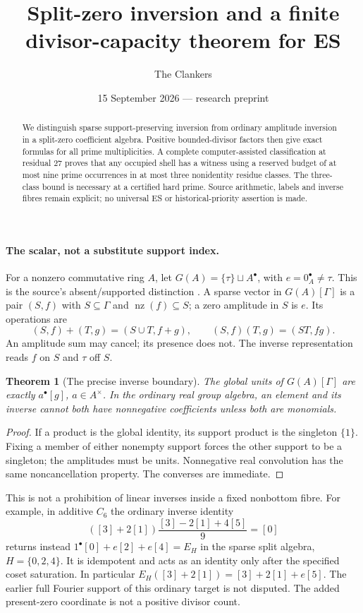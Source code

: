 \documentclass[10pt,a4paper]{article}
\title{Split-zero inversion and a finite divisor-capacity theorem for ES}
\author{The Clankers}
\date{15 September 2026 --- research preprint}
\newtheorem{theorem}{Theorem}
\begin{document}
\maketitle
\begin{abstract}
We distinguish sparse support-preserving inversion from ordinary amplitude
inversion in a split-zero coefficient algebra. Positive bounded-divisor factors
then give exact formulas for all prime multiplicities. A complete computer-assisted
classification at residual 27 proves that any occupied shell has a witness
using a reserved budget of at most nine prime occurrences in at most three
nonidentity residue classes. The three-class bound is necessary at a certified
hard prime. Source arithmetic, labels and inverse fibres remain explicit;
no universal ES or historical-priority assertion is made.
\end{abstract}

\paragraph{The scalar, not a substitute support index.}
For a nonzero commutative ring $A$, let
$G(A)=\{\tau\}\sqcup A^\bullet$, with $e=0_A^\bullet\ne\tau$.
This is the source's absent/supported distinction \cite{SZ}. A sparse vector
in $G(A)[\Gamma]$ is a pair $(S,f)$ with $S\subseteq\Gamma$ and
$\operatorname{nz}(f)\subseteq S$; a zero amplitude in $S$ is $e$.
Its operations are
\[
 (S,f)+(T,g)=(S\cup T,f+g),\qquad(S,f)(T,g)=(ST,fg).
 \tag{1}
\]
An amplitude sum may cancel; its presence does not. The inverse representation
reads $f$ on $S$ and $\tau$ off $S$.

\begin{theorem}[The precise inverse boundary]
The global units of $G(A)[\Gamma]$ are exactly $a^\bullet[g]$,
$a\in A^\times$. In the ordinary real group algebra, an element and its inverse
cannot both have nonnegative coefficients unless both are monomials.
\end{theorem}
\begin{proof}
If a product is the global identity, its support product is the singleton
$\{1\}$. Fixing a member of either nonempty support forces the other support
to be a singleton; the amplitudes must be units. Nonnegative real convolution
has the same noncancellation property. The converses are immediate.
\end{proof}
This is not a prohibition of linear inverses inside a fixed nonbottom fibre.
For example, in additive $C_6$ the ordinary inverse identity
\[
 ([3]+2[1])\frac{[3]-2[1]+4[5]}9=[0]
\]
returns instead $1^\bullet[0]+e[2]+e[4]=E_H$ in the sparse split algebra,
$H=\{0,2,4\}$. It is idempotent and acts as an identity only after the
specified coset saturation. In particular
$E_H([3]+2[1])=[3]+2[1]+e[5]$.
The earlier full Fourier support of this ordinary target \cite{Target} is
not disputed. The added present-zero coordinate is not a positive divisor count.
\end{document}
